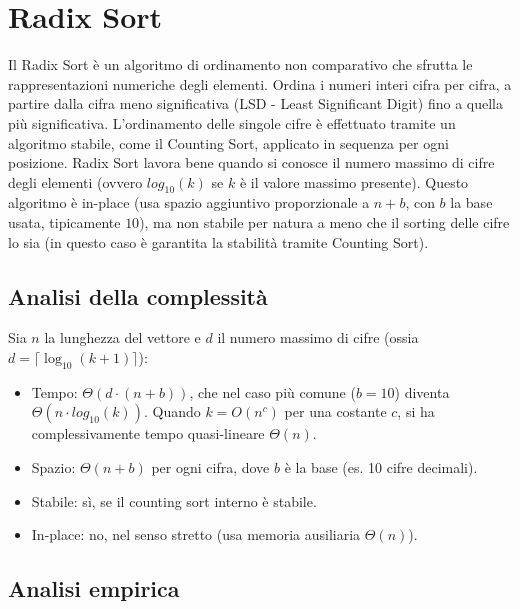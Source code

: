 \documentclass[a4paper, 12pt, oneside]{book}
\begin{document}



\chapter{Radix Sort}\label{chap:Radix Sort} %

Il Radix Sort è un algoritmo di ordinamento non comparativo che sfrutta le rappresentazioni numeriche degli elementi. Ordina i numeri interi cifra per cifra, a partire dalla cifra meno significativa (LSD - Least Significant Digit) fino a quella più significativa. L'ordinamento delle singole cifre è effettuato tramite un algoritmo stabile, come il Counting Sort, applicato in sequenza per ogni posizione.
Radix Sort lavora bene quando si conosce il numero massimo di cifre degli elementi (ovvero \(log_{10}(k)\) se \(k\) è il valore massimo presente).
Questo algoritmo è in-place (usa spazio aggiuntivo proporzionale a \(n + b\), con \(b\) la base usata, tipicamente \(10\)), ma non stabile per natura a meno che il sorting delle cifre lo sia (in questo caso è garantita la stabilità tramite Counting Sort).

\section{Analisi della complessità}
Sia \(n\) la lunghezza del vettore e \(d\) il numero massimo di cifre (ossia \( d = \lceil \log_{10}(k + 1) \rceil \)): \\

\begin{itemize}
    \item Tempo: \(\Theta(d \cdot (n + b))\), che nel caso più comune (\(b = 10\)) diventa \(\Theta(n \cdot log_{10}(k))\). Quando \(k = O(n^c)\) per una costante \(c\), si ha complessivamente tempo quasi-lineare \(\Theta(n)\).
    \item Spazio: \(\Theta(n + b)\) per ogni cifra, dove \(b\) è la base (es. 10 cifre decimali).
    \item Stabile: sì, se il counting sort interno è stabile.
    \item In-place: no, nel senso stretto (usa memoria ausiliaria \(\Theta(n)\)).
\end{itemize}

\section{Analisi empirica}
\end{document}
